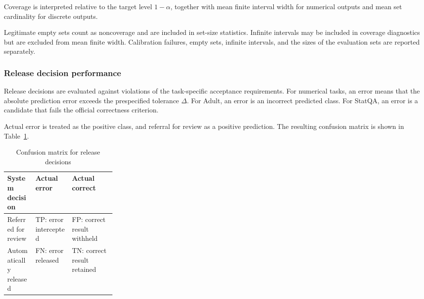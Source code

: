 \documentclass[preprint,12pt,authoryear]{elsarticle}
\begin{document}
Coverage is interpreted relative to the target level \(1-\alpha\), together with mean finite interval width for numerical outputs and mean set cardinality for discrete outputs.

Legitimate empty sets count as noncoverage and are included in set-size statistics. Infinite intervals may be included in coverage diagnostics but are excluded from mean finite width. Calibration failures, empty sets, infinite intervals, and the sizes of the evaluation sets are reported separately.

\subsubsection{Release decision performance}
\label{sec:exp_release_performance}

Release decisions are evaluated against violations of the task-specific acceptance requirements. For numerical tasks, an error means that the absolute prediction error exceeds the prespecified tolerance \(\Delta\). For Adult, an error is an incorrect predicted class. For StatQA, an error is a candidate that fails the official correctness criterion.

Actual error is treated as the positive class, and referral for review as a positive prediction. The resulting confusion matrix is shown in Table~\ref{tab:exp_release_confusion}.

\begin{table}[H]
    \centering
    \caption{Confusion matrix for release decisions}
    \label{tab:exp_release_confusion}
    \small
    \renewcommand{\arraystretch}{1.2}

    \begin{tabularx}{\linewidth}{
        @{}
        >{\raggedright\arraybackslash}p{0.26\linewidth}
        >{\raggedright\arraybackslash}X
        >{\raggedright\arraybackslash}X
        @{}
    }
        \toprule
        \textbf{System decision}
        & \textbf{Actual error}
        & \textbf{Actual correct} \\
        \midrule

        Referred for review
        & TP: error intercepted
        & FP: correct result withheld \\

        Automatically released
        & FN: error released
        & TN: correct result retained \\

        \bottomrule
    \end{tabularx}
\end{table}
\end{document}
